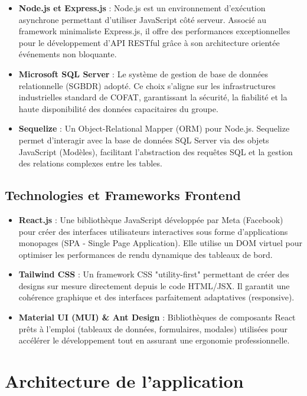 \begin{itemize}[label=\textbullet]
    \item \textbf{Node.js et Express.js} : Node.js est un environnement d'exécution asynchrone permettant d'utiliser JavaScript côté serveur. Associé au framework minimaliste Express.js, il offre des performances exceptionnelles pour le développement d'API RESTful grâce à son architecture orientée événements non bloquante.
    \item \textbf{Microsoft SQL Server} : Le système de gestion de base de données relationnelle (SGBDR) adopté. Ce choix s'aligne sur les infrastructures industrielles standard de COFAT, garantissant la sécurité, la fiabilité et la haute disponibilité des données capacitaires du groupe.
    \item \textbf{Sequelize} : Un Object-Relational Mapper (ORM) pour Node.js. Sequelize permet d'interagir avec la base de données SQL Server via des objets JavaScript (Modèles), facilitant l'abstraction des requêtes SQL et la gestion des relations complexes entre les tables.
\end{itemize}

\subsection{Technologies et Frameworks Frontend}

\begin{itemize}[label=\textbullet]
    \item \textbf{React.js} : Une bibliothèque JavaScript développée par Meta (Facebook) pour créer des interfaces utilisateurs interactives sous forme d'applications monopages (SPA - Single Page Application). Elle utilise un DOM virtuel pour optimiser les performances de rendu dynamique des tableaux de bord.
    \item \textbf{Tailwind CSS} : Un framework CSS "utility-first" permettant de créer des designs sur mesure directement depuis le code HTML/JSX. Il garantit une cohérence graphique et des interfaces parfaitement adaptatives (responsive).
    \item \textbf{Material UI (MUI) \& Ant Design} : Bibliothèques de composants React prêts à l'emploi (tableaux de données, formulaires, modales) utilisées pour accélérer le développement tout en assurant une ergonomie professionnelle.
\end{itemize}

\section{Architecture de l’application}

